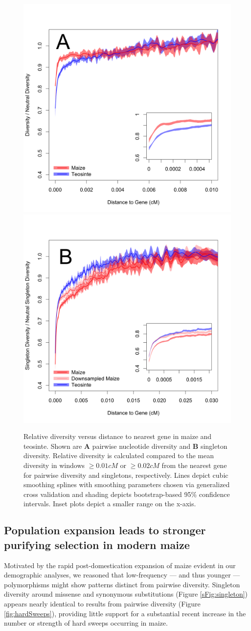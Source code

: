 \documentclass{pnastwo}
\begin{document}
\begin{article}
\begin{figure}[tb]
\centering
\includegraphics[width=.45\textwidth]{FigsAndFiles/distanceToGene_WithSignificance_Folded2_manuscript.png} \includegraphics[width=.45\textwidth]{FigsAndFiles/distanceToGene_WithSignificance_Singletons_Downsampled_threeLines_manuscript.png}
\caption{Relative diversity versus distance to nearest gene in maize and teosinte. 
Shown are \textbf{A} pairwise nucleotide diversity and \textbf{B} singleton diversity.  
Relative diversity is calculated compared to the mean diversity in windows $\geq 0.01 cM$ or $\geq 0.02 cM$ from the nearest
gene for pairwise diversity and singletons, respectively. 
  Lines depict cubic smoothing splines with smoothing parameters chosen via generalized cross validation and shading depicts bootstrap-based 95\% confidence intervals.
  Inset plots depict a smaller range on the x-axis. \label{fig:purify}
  }
\end{figure}

\subsection{Population expansion leads to stronger purifying selection in modern maize} %
Motivated by the rapid post-domestication expansion of maize evident in our demographic analyses, we reasoned that low-frequency --- and thus younger --- polymorphisms might show patterns distinct from pairwise diversity. 
Singleton diversity around missense and synonymous substitutions (Figure \ref{sFig:singleton}) appears nearly identical to results from pairwise diversity (Figure \ref{fig:hardSweeps}), providing little support for a substantial recent increase in the number or strength of hard sweeps occurring in maize. 


\end{article}
\end{document}
